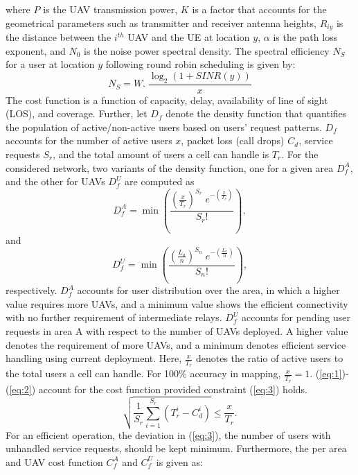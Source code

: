 \documentclass[journal]{IEEEtran}
\begin{document}
where $P$ is the UAV transmission power, $K$ is a factor that accounts for the geometrical parameters such as transmitter and receiver antenna heights, $R_{iy}$ is the distance between the $i^{th}$ UAV and the UE at location $y$, $\alpha$ is the path loss exponent, and $N_{0}$ is the noise power spectral density. The spectral efficiency $N_{S}$ for a user at location $y$ following round robin scheduling is given by:
\begin{equation}
N_{S}=W.\;\frac{\log_{2} \left( 1+SINR(y) \right)}{x}
\end{equation}
The cost function is a function of capacity, delay, availability of line of sight (LOS), and coverage. Further, let $D_{f}$ denote the density function that quantifies the population of active/non-active users based on users' request patterns. $D_{f}$ accounts for the number of active users $x$, packet loss (call drops) $C_{d}$, service requests $S_{r}$, and the total amount of users a cell can handle is $T_{r}$. For the considered network, two variants of the density function, one for a given area $D_{f}^{A}$, and the other for UAVs $D_{f}^{U}$ are computed as
\begin{equation}\label{eq:1}
D_{f}^{A}=\min\left(\frac{\left(\frac{x}{T_{r}}\right)^{S_{r}}\;e^{- \left(\frac{x}{T_{r}}\right)}}{S_{r}!}\right),
\end{equation}
and
\begin{equation}\label{eq:2}
D_{f}^{U}=\min\left(\frac{\left(\frac{L_{a}}{n}\right)^{S_{n}}\;e^{- \left(\frac{L_{a}}{n}\right)}}{S_{n}!}\right),
\end{equation}
respectively. $D_{f}^{A}$ accounts for user distribution over the area, in which a higher value requires more UAVs, and a minimum value shows the efficient connectivity with no further requirement of intermediate relays. $D_{f}^{U}$ accounts for pending user requests in area A with respect to the number of UAVs deployed. A higher value denotes the requirement of more UAVs, and a minimum denotes efficient service handling using current deployment. Here, $\frac{x}{T_{r}}$ denotes the ratio of active users to the total users a cell can handle. For 100\% accuracy in mapping, $\frac{x}{T_{r}}=1$. (\ref{eq:1})-(\ref{eq:2}) account for the cost function provided constraint (\ref{eq:3}) holds.
\begin{equation}\label{eq:3}
\sqrt{\frac{1}{S_{r}} \sum_{i=1}^{S_{r}} \left( T_{r}^{i}-C_{d}^{i}\right)} \leq \frac{x}{T_{r}}.
\end{equation}
For an efficient operation, the deviation in (\ref{eq:3}), the number of users with unhandled service requests, should be kept minimum. Furthermore, the per area and UAV cost function $C_{f}^{A}$ and $C_{f}^{U}$ is given as:
\end{document}
